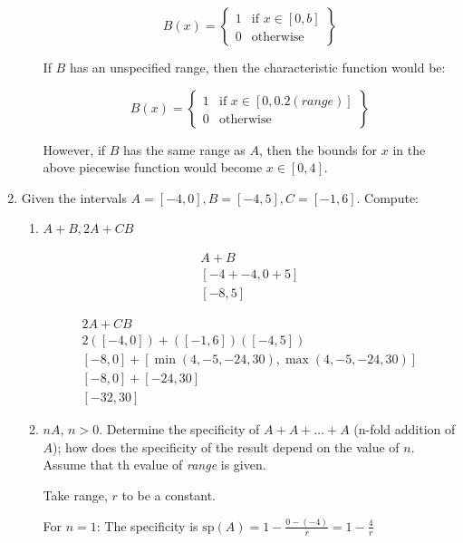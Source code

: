 \documentclass{article}
\begin{document}
\begin{enumerate}
\begin{enumerate}
		\[
			B(x) = \left\{ \begin{matrix}
				1 & \text{if } x \in [0, b] \\
				0 & \text{otherwise}
			\end{matrix} \right\}
		\]
		
		If $B$ has an unspecified range, then the characteristic function would be:
		
		\[
			B(x) = \left \{ \begin{matrix}
				1 & \text{if } x \in [0, 0.2(range)]\\
				0 & \text{otherwise}
			\end{matrix} \right \}
		\]
		
		However, if $B$ has the same range as $A$, then the bounds for $x$ in the above piecewise function would become $x \in [0, 4]$.

	\end{enumerate}
	
	\item Given the intervals $A = [-4, 0], B=[-4, 5], C=[-1, 6]$. Compute:
	
	\begin{enumerate}
	
		\item $A + B, 2A + CB$
		
		\[
		\begin{matrix}
			A + B\\
			[-4 + -4, 0 + 5]\\
			[-8, 5]
		\end{matrix}
		\]
		
		\[
		\begin{matrix}
			2A + CB\\
			2([-4, 0]) + ([-1, 6])([-4, 5])\\
			[-8, 0] + [\min(4, -5, -24, 30), \max(4, -5, -24, 30)]\\
			[-8, 0] + [-24, 30]\\
			[-32, 30]
		\end{matrix}
		\]
		
		\item $nA$, $n > 0$. Determine the specificity of $A + A + \dots + A$ (n-fold addition of $A$); how does the specificity of the result depend on the value of $n$. Assume that th evalue of \textit{range} is given.
	
		Take range, $r$ to be a constant.
		
		For $n = 1$: The specificity is $\text{sp}(A) = 1 - \frac{0 - (-4)}{r} = 1 - \frac 4 r$


\end{enumerate}
\end{enumerate}
\end{document}
